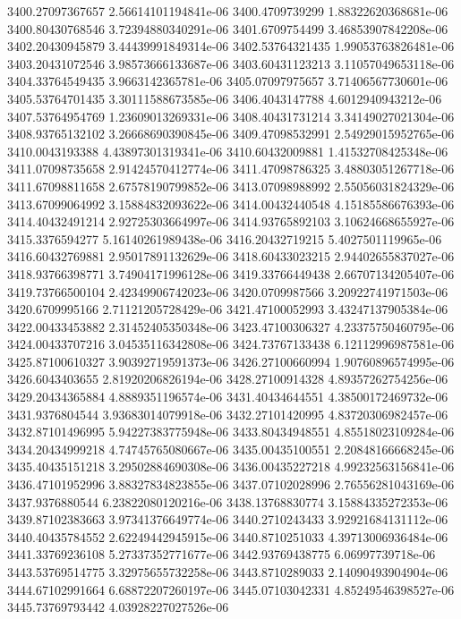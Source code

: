 {3400.27097367657 2.56614101194841e-06
3400.4709739299 1.88322620368681e-06
3400.80430768546 3.72394880340291e-06
3401.6709754499 3.46853907842208e-06
3402.20430945879 3.44439991849314e-06
3402.53764321435 1.99053763826481e-06
3403.20431072546 3.98573666133687e-06
3403.60431123213 3.11057049653118e-06
3404.33764549435 3.9663142365781e-06
3405.07097975657 3.71406567730601e-06
3405.53764701435 3.30111588673585e-06
3406.4043147788 4.6012940943212e-06
3407.53764954769 1.23609013269331e-06
3408.40431731214 3.34149027021304e-06
3408.93765132102 3.26668690390845e-06
3409.47098532991 2.54929015952765e-06
3410.0043193388 4.43897301319341e-06
3410.60432009881 1.41532708425348e-06
3411.07098735658 2.91424570412774e-06
3411.47098786325 3.48803051267718e-06
3411.67098811658 2.67578190799852e-06
3413.07098988992 2.55056031824329e-06
3413.67099064992 3.15884832093622e-06
3414.00432440548 4.15185586676393e-06
3414.40432491214 2.92725303664997e-06
3414.93765892103 3.10624668655927e-06
3415.3376594277 5.16140261989438e-06
3416.20432719215 5.4027501119965e-06
3416.60432769881 2.95017891132629e-06
3418.60433023215 2.94402655837027e-06
3418.93766398771 3.74904171996128e-06
3419.33766449438 2.66707134205407e-06
3419.73766500104 2.42349906742023e-06
3420.0709987566 3.20922741971503e-06
3420.6709995166 2.71121205728429e-06
3421.47100052993 3.43247137905384e-06
3422.00433453882 2.31452405350348e-06
3423.47100306327 4.23375750460795e-06
3424.00433707216 3.04535116342808e-06
3424.73767133438 6.12112996987581e-06
3425.87100610327 3.90392719591373e-06
3426.27100660994 1.90760896574995e-06
3426.6043403655 2.81920206826194e-06
3428.27100914328 4.89357262754256e-06
3429.20434365884 4.8889351196574e-06
3431.40434644551 4.38500172469732e-06
3431.9376804544 3.93683014079918e-06
3432.27101420995 4.83720306982457e-06
3432.87101496995 5.94227383775948e-06
3433.80434948551 4.85518023109284e-06
3434.20434999218 4.74745765080667e-06
3435.00435100551 2.20848166668245e-06
3435.40435151218 3.29502884690308e-06
3436.00435227218 4.99232563156841e-06
3436.47101952996 3.88327834823855e-06
3437.07102028996 2.76556281043169e-06
3437.9376880544 6.23822080120216e-06
3438.13768830774 3.15884335272353e-06
3439.87102383663 3.97341376649774e-06
3440.2710243433 3.92921684131112e-06
3440.40435784552 2.62249442945915e-06
3440.8710251033 4.39713006936484e-06
3441.33769236108 5.27337352771677e-06
3442.93769438775 6.06997739718e-06
3443.53769514775 3.32975655732258e-06
3443.8710289033 2.14090493904904e-06
3444.67102991664 6.68872207260197e-06
3445.07103042331 4.85249546398527e-06
3445.73769793442 4.03928227027526e-06
}
